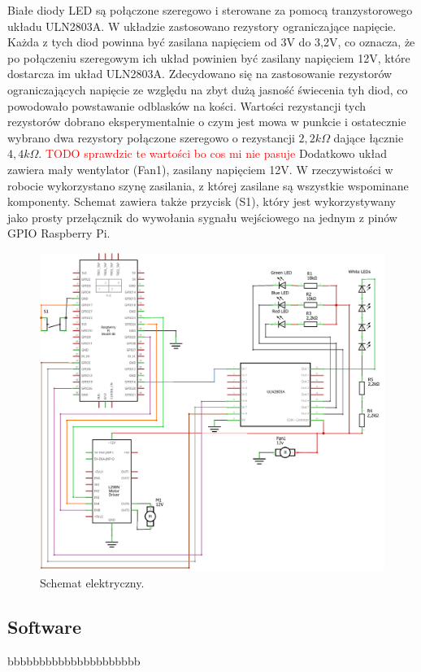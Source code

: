 Białe diody LED są połączone szeregowo i sterowane za pomocą tranzystorowego układu ULN2803A. W układzie zastosowano rezystory ograniczające napięcie. Każda z tych diod powinna być 
zasilana napięciem od 3V do 3,2V, co oznacza, że po połączeniu szeregowym ich układ powinien być zasilany napięciem 12V, które dostarcza im układ ULN2803A. Zdecydowano się na zastosowanie
rezystorów ograniczających napięcie ze względu na zbyt dużą jasność świecenia tyh diod, co powodowało powstawanie odblasków na kości. Wartości rezystancji tych rezystorów dobrano eksperymentalnie o czym jest mowa w punkcie
i ostatecznie wybrano dwa rezystory połączone szeregowo o rezystancji $2,2k\Omega$ dające łącznie $4,4k\Omega$. \textcolor{red}{TODO sprawdzic te wartości bo cos mi nie pasuje}
Dodatkowo układ zawiera mały wentylator (Fan1), zasilany napięciem 12V. W rzeczywistości w robocie wykorzystano szynę zasilania, z której zasilane są wszystkie wspominane komponenty. 
Schemat zawiera także przycisk (S1), który jest wykorzystywany jako prosty przełącznik do wywołania sygnału wejściowego na jednym z pinów GPIO Raspberry Pi.

\begin{figure}[H]
    \centering
    \includegraphics[width=0.95\linewidth]{chapters/03-praca-wlasna/figures/electronics circut_schem}
    \caption{\label{fig:electronics}Schemat elektryczny.}
\end{figure}

\subsection{Software}\label{subsec:software}
bbbbbbbbbbbbbbbbbbbbb